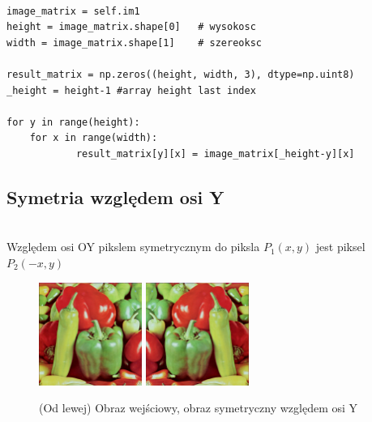 \documentclass[final,a4paper,openany,12pt]{mwbk}
\begin{document}
\begin{lstlisting}[caption= Symetrie względem osi X]

image_matrix = self.im1
height = image_matrix.shape[0]   # wysokosc
width = image_matrix.shape[1]    # szereoksc

result_matrix = np.zeros((height, width, 3), dtype=np.uint8)
_height = height-1 #array height last index

for y in range(height):
    for x in range(width): 
            result_matrix[y][x] = image_matrix[_height-y][x]

\end{lstlisting}

\subsection*{ Symetria względem osi Y}
\hfill\\
\indent
Względem osi OY pikslem symetrycznym do piksla $P_{1}(x,y)$ jest piksel $P_{2}(-x,y)$


\begin{figure}[H]
	\begin{center}
		\includegraphics[width=0.3\textwidth]{1/1Geo_oy_Original}
		\includegraphics[width=0.3\textwidth]{1/1Geo_oy_Result}
	\end{center}
	\caption{(Od lewej) Obraz wejściowy, obraz symetryczny względem osi Y }
\end{figure}
\end{document}
